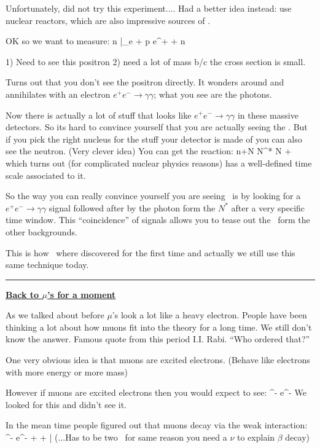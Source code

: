 {Unfortunately, did not try this experiment....
Had a better idea instead: use nuclear reactors, which are also impressive sources of \nus.

\clearpage 

OK so we want to measure:
n
\be
\bar{\nu}_e + p \rightarrow e^+ + n
\ee

1) Need to see this positron 2) need a lot of mass b/c the cross section is small. 

Turns out that you don't see the positron directly. 
It wonders around and annihilates with an electron $e^+e^-\rightarrow \gamma\gamma$; what you see are the photons. 

Now there is actually a lot of stuff that looks like $e^+e^-\rightarrow \gamma\gamma$ in these massive detectors.
So its hard to convince yourself that you are actually seeing the \nus.
But if you pick the right nucleus for the stuff your detector is made of you can also see the neutron. 
(Very clever idea) You can get the reaction:
\be
n+N \rightarrow N^* \rightarrow N + \gamma
\ee
which turns out (for complicated nuclear physics reasons) has a well-defined time scale associated to it. 

So the way you can really convince yourself you are seeing \nus\ is by looking for a $e^+e^-\rightarrow \gamma\gamma$ signal followed after by the photon form the $N^*$ after a very specific time window. 
This ``coincidence'' of signals allows you to tease out the \nus\ form the other backgrounds.

This is how \nus\ where discovered for the first time and actually we still use this same technique today.

\noindent\rule{\textwidth}{1pt}

\textbf{\underline{Back to $\mu$'s for a moment}}

As we talked about before $\mu$'s look a lot like a heavy electron. 
People have been thinking a lot about how muons fit into the theory for a long time. 
We still don't know the answer.  
Famous quote from this period I.I. Rabi. ``Who ordered that?''

One very obvious idea is that muons are excited electrons. (Behave like electrons with more energy or more mass) 

However if muons are excited electrons then you would expect to see:
\be
\mu^- \rightarrow e^- \gamma
\ee
We looked for this and didn't see it. 

In the mean time people figured out that muons decay via the weak interaction: 
\be
\mu^- \rightarrow e^- + \nu + \bar{\nu}
\ee
(...Has to be two \nus\ for same reason you need a $\nu$ to explain $\beta$ decay) 

}

